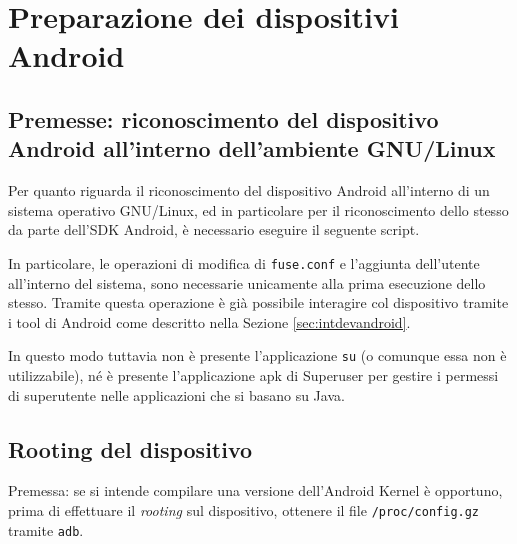 \chapter{Preparazione dei dispositivi Android}
\minitoc\mtcskip

\section{Premesse: riconoscimento del dispositivo Android all'interno dell'ambiente GNU/Linux}
Per quanto riguarda il riconoscimento del dispositivo Android all'interno di un
sistema operativo GNU/Linux, ed in particolare per il riconoscimento dello stesso
da parte dell'SDK Android, è necessario eseguire il seguente script.

In particolare, le operazioni di modifica di \texttt{\small fuse.conf} e l'aggiunta
dell'utente all'interno del sistema, sono necessarie unicamente alla prima
esecuzione dello stesso. Tramite questa operazione è già possibile interagire col 
dispositivo tramite i tool di Android come descritto nella Sezione \vref{sec:intdevandroid}.

In questo modo tuttavia non è presente l'applicazione \texttt{su} (o comunque essa 
non è utilizzabile), né è presente l'applicazione apk di Superuser per gestire
i permessi di superutente nelle applicazioni che si basano su Java.


\section{Rooting del dispositivo}\label{sec:rootingdevice}
Premessa:
se si intende compilare una versione dell'Android Kernel è opportuno, 
prima di effettuare il \textit{rooting} sul dispositivo, ottenere 
 il file \texttt{\small /proc/config.gz} tramite \texttt{\small adb}.
\bigskip

